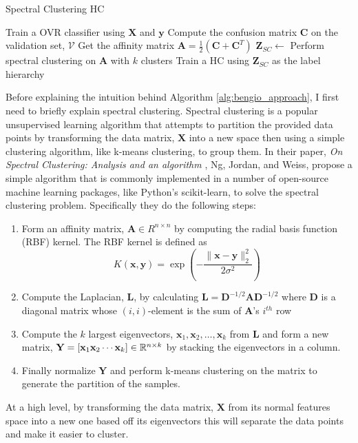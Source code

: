 \documentclass[../thesis.tex]{subfiles}
\begin{document}
\begin{algorithm}[H]
    \caption{Spectral Clustering HC}
    \label{alg:bengio_approach}
    \begin{algorithmic}[1]
            \State Train a OVR classifier using $\mathbf{X}$ and $\mathbf{y}$
            \State Compute the confusion matrix $\mathbf{C}$ on the validation set, $\mathcal{V}$
            \State Get the affinity matrix $\mathbf{A} = \frac{1}{2}\left(\mathbf{C} + \mathbf{C}^T\right)$
            \State $\mathbf{Z}_{SC} \gets $ Perform spectral clustering on $\mathbf{A}$ with $k$ clusters
            \State Train a HC using $\mathbf{Z}_{SC}$ as the label hierarchy
        \EndProcedure
    \end{algorithmic}
\end{algorithm}

Before explaining the intuition behind Algorithm \ref{alg:bengio_approach}, I first need to briefly explain spectral clustering. Spectral clustering is a popular unsupervised learning algorithm that attempts to partition the provided data points by transforming the data matrix, $\mathbf{X}$ into a new space then using a simple clustering algorithm, like k-means clustering, to group them. In their paper, \textit{On Spectral Clustering: Analysis and an algorithm} \cite{ng2002spectral}, Ng, Jordan, and Weiss, propose a simple algorithm that is commonly implemented in a number of open-source machine learning packages, like Python's scikit-learn, to solve the spectral clustering problem. Specifically they do the following steps:
\begin{enumerate}
    \item Form an affinity matrix, $\mathbf{A} \in R^{n \times n}$ by computing the radial basis function (RBF) kernel. The RBF kernel is defined as
    \begin{equation}
        K(\mathbf{x}, \mathbf{y}) = \exp\left(-\frac{\lVert \mathbf{x} - \mathbf{y}\rVert_2^2}{2\sigma^2}\right)
    \end{equation}
    \item Compute the Laplacian, $\mathbf{L}$, by calculating $\mathbf{L} = \mathbf{D}^{-1/2}\mathbf{A}\mathbf{D}^{-1/2}$ where $\mathbf{D}$ is a diagonal matrix whose $(i, i)$-element is the sum of $\mathbf{A}$'s $i^{th}$ row
    \item Compute the $k$ largest eigenvectors, $\mathbf{x}_1, \mathbf{x}_2, \ldots, \mathbf{x}_k$ from $\mathbf{L}$ and form a new matrix, $\mathbf{Y} = [\mathbf{x}_1 \mathbf{x}_2 \cdots \mathbf{x}_k] \in \mathbb{R}^{n \times k}$ by stacking the eigenvectors in a column. 
    \item Finally normalize $\mathbf{Y}$ and perform k-means clustering on the matrix to generate the partition of the samples. 
\end{enumerate}
At a high level, by transforming the data matrix, $\mathbf{X}$ from its normal features space into a new one based off its eigenvectors this will separate the data points and make it easier to cluster. 
\end{document}
